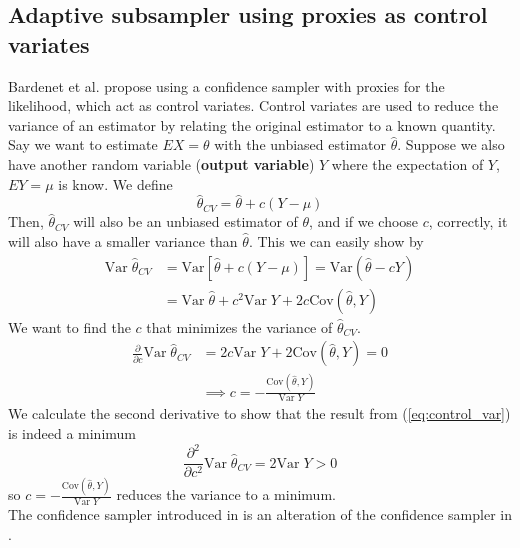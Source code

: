 \documentclass{article}
\theoremstyle{definition}
\begin{document}
\subsection{Adaptive subsampler using proxies as control variates}
Bardenet et al. \cite{Bardenet:1} propose using a confidence sampler with proxies for the likelihood, which act as control variates. 
Control variates are used to reduce the variance of an estimator by relating the original estimator to a known quantity. 
Say we want to estimate $EX = \theta$ with the unbiased estimator $\hat{\theta}$. Suppose we also have another random variable (\textbf{output variable}) $Y$ where the expectation of $Y$, $EY = \mu$ is know. 
We define $$\hat{\theta}_{CV} = \hat{\theta} + c\left(Y - \mu\right) $$  Then, $\hat{\theta}_{CV}$ will also be  an unbiased estimator of $\theta$, and if we choose $c$, correctly, it will also have a smaller variance than $\hat{\theta}$. 
This we can easily show by \begin{equation*}
\begin{split}
    \mathrm{Var}\;\hat{\theta}_{CV}  &= \mathrm{Var}\left[\hat{\theta} + c\left(Y - \mu\right)\right]
     = \mathrm{Var}\left(\hat{\theta} - cY\right) \\ & = \mathrm{Var}\;\hat{\theta} + c^2\mathrm{Var}\;Y + 2c\mathrm{Cov}\left(\hat{\theta}, Y\right)
\end{split}
\end{equation*}
We want to find the $c$ that minimizes the variance of $\hat{\theta}_{CV}$. 
\begin{equation}\label{eq:control_var}
\begin{split}
    \frac{\partial}{\partial c} \mathrm{Var}\; \hat{\theta}_{CV} &= 2c\mathrm{Var}\;Y + 2\mathrm{Cov}\left(\hat{\theta}, Y\right) = 0 \\
    & \implies c = - \frac{\mathrm{Cov}\left(\hat{\theta}, Y\right)}{\mathrm{Var}\;Y}
\end{split}
\end{equation}
We calculate the second derivative to show that the result from (\ref{eq:control_var}) is indeed a minimum
\begin{equation*}
    \frac{\partial^2}{\partial c^2} \mathrm{Var}\; \hat{\theta}_{CV}  = 2\mathrm{Var}\; Y > 0 
\end{equation*}
so $c = -\frac{\mathrm{Cov}\left(\hat{\theta}, Y\right)}{\mathrm{Var}\;Y}$ reduces the variance to a minimum. \\
The confidence sampler introduced in \cite{Bardenet:1} is an alteration of the confidence sampler in \cite{Bardenet:2}. 
\end{document}
